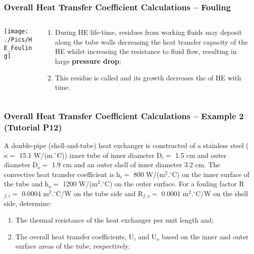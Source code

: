 \documentclass[10pt,compress,handout,ignorenonframetext,unknownkeysallowed]{beamer}
\begin{document}
\begin{frame}
  \frametitle{Overall Heat Transfer Coefficient Calculations -- Fouling}
    \begin{columns}
       \begin{column}[l]{0.5\linewidth}
         \texttt{[image: ./Pics/HE\_Fouling]}
       \end{column}
       \begin{column}[l]{0.5\linewidth}
          \begin{enumerate}\scriptsize
              \item<1-> During HE life-time, residues from working fluids may deposit along the tube walls decreasing the heat transfer capacity of the HE whilst increasing the resistance to fluid flow, resulting in large {\bf pressure drop};
              \item<1-> This residue is called  and its growth decreases the  of HE with time.
          \end{enumerate}
       \end{column}      
    \end{columns}


\end{frame}


\begin{frame}
  \frametitle{Overall Heat Transfer Coefficient Calculations -- Example 2 (Tutorial P12)}

A double-pipe (shell-and-tube) heat exchanger is constructed of a stainless steel ($\kappa=$ 15.1 W/(m.$^{\circ}$C)) inner tube of inner diameter D$_{i}=$ 1.5 cm and outer diameter D$_{o}=$ 1.9 cm and an outer shell of inner diameter 3.2 cm. The convective heat transfer coefficient is h$_{i}=$ 800 W/(m$^{2}.^{\circ}$C) on the inner surface of the tube and h$_{o}=$ 1200 W/(m$^{2}.^{\circ}$C) on the outer surface. For a fouling factor R$_{f,i}=$ 0.0004 m$^{2}.^{\circ}$C/W on the tube side and R$_{f,o}=$ 0.0001 m$^{2}.^{\circ}$C/W on the shell side, determine:
\begin{enumerate}
   \item The thermal resistance of the heat exchanger per unit length and; 
   \item The overall heat transfer coefficients, U$_{i}$ and U$_{o}$ based on the inner and outer surface areas of the tube, respectively.
\end{enumerate}

\end{frame}
\end{document}
